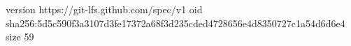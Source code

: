 version https://git-lfs.github.com/spec/v1
oid sha256:5d5c590f3a3107d3fe17372a68f3d235cded4728656e4d8350727c1a54d6d6e4
size 59

